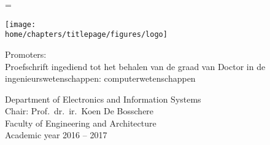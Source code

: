 \documentclass[\home/main.tex]{subfiles}
\begin{document}
\begin{titlepage}

\emergencystretch=\maxdimen
{}

\phdsansfont

   \vspace*{0.1\paperheight}
   
   \begin{flushright}
   	 \huge\thetitle
   	 
   	 \vspace*{0.75cm}
   	 
   	 \huge\thetitleNL
   	 
   	 \vspace*{1.5cm}
   	 
   	 \Large\theauthor
   \end{flushright}

   \vfill
   	
	\begin{minipage}[b]{0.15\linewidth}
		\texttt{[image: \\home/chapters/titlepage/figures/logo]}
	\end{minipage}%
	\begin{minipage}[b]{0.85\linewidth}%
		\begin{flushright}
		Promoters: \thepromotors\\
		Proefschrift ingediend tot het behalen van de graad van Doctor in de ingenieurswetenschappen: computerwetenschappen
		
		
		\vspace*{1em}
		
		Department of Electronics and Information Systems\\
		Chair: Prof.\ dr.\ ir.\ Koen De Bosschere\\
		Faculty of Engineering and Architecture \\ 
		Academic year 2016 -- 2017
		\end{flushright}%
	\end{minipage}%
\end{titlepage}
\end{document}
